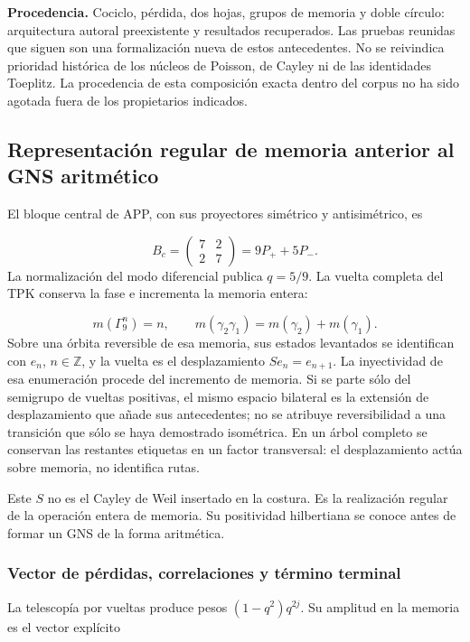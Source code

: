 \textbf{Procedencia.} Cociclo, pérdida, dos hojas, grupos de memoria y doble círculo: arquitectura autoral preexistente y resultados recuperados. Las pruebas reunidas que siguen son una formalización nueva de estos antecedentes. No se reivindica prioridad histórica de los núcleos de Poisson, de Cayley ni de las identidades Toeplitz. La procedencia de esta composición exacta dentro del corpus no ha sido agotada fuera de los propietarios indicados.


\subsection{Representación regular de memoria anterior al GNS aritmético}
\label{tm-add-m2}
El bloque central de APP, con sus proyectores simétrico y antisimétrico, es

\[
B_c=\begin{pmatrix}7&2\\2&7\end{pmatrix}
=9P_++5P_-.
\]
La normalización del modo diferencial publica \(q=5/9\). La vuelta completa del TPK conserva la fase e incrementa la memoria entera:

\[
m(\Gamma_9^n)=n,\qquad
m(\gamma_2\gamma_1)=m(\gamma_2)+m(\gamma_1).
\]
Sobre una órbita reversible de esa memoria, sus estados levantados se identifican con \(e_n\), \(n\in\mathbb Z\), y la vuelta es el desplazamiento \(Se_n=e_{n+1}\). La inyectividad de esa enumeración procede del incremento de memoria. Si se parte sólo del semigrupo de vueltas positivas, el mismo espacio bilateral es la extensión de desplazamiento que añade sus antecedentes; no se atribuye reversibilidad a una transición que sólo se haya demostrado isométrica. En un árbol completo se conservan las restantes etiquetas en un factor transversal: el desplazamiento actúa sobre memoria, no identifica rutas.

Este \(S\) no es el Cayley de Weil insertado en la costura. Es la realización regular de la operación entera de memoria. Su positividad hilbertiana se conoce antes de formar un GNS de la forma aritmética.


\subsubsection{Vector de pérdidas, correlaciones y término terminal}
\label{tm-add-m2-1}
La telescopía por vueltas produce pesos \((1-q^2)q^{2j}\). Su amplitud en la memoria es el vector explícito

